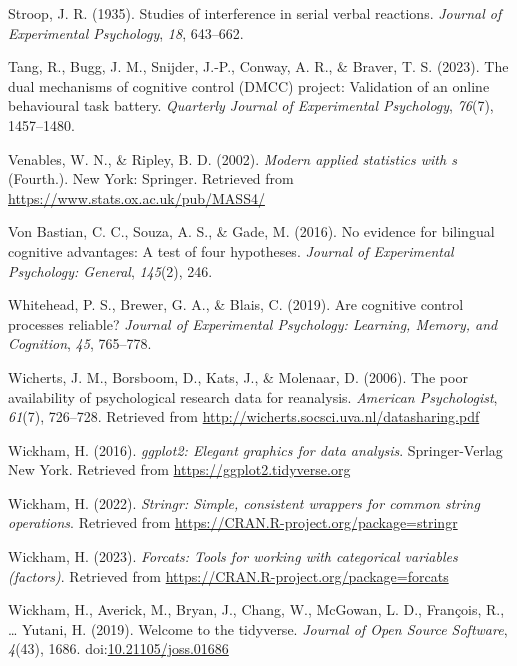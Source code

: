 \documentclass[
  man,floatsintext]{apa6}
\newlength{\cslhangindent}
\newlength{\cslentryspacingunit} %
\newenvironment{CSLReferences}[2] %
 {%
  \setlength{\parindent}{0pt}
  \ifodd #1
  \let\oldpar\par
  \def\par{\hangindent=\cslhangindent\oldpar}
  \fi
  \setlength{\parskip}{#2\cslentryspacingunit}
 }%
 {}
\begin{document}
\begin{CSLReferences}{1}{0}
\leavevmode{}%
Stroop, J. R. (1935). Studies of interference in serial verbal reactions. \emph{Journal of Experimental Psychology}, \emph{18}, 643--662.

\leavevmode{}%
Tang, R., Bugg, J. M., Snijder, J.-P., Conway, A. R., \& Braver, T. S. (2023). The dual mechanisms of cognitive control (DMCC) project: Validation of an online behavioural task battery. \emph{Quarterly Journal of Experimental Psychology}, \emph{76}(7), 1457--1480.

\leavevmode{}%
Venables, W. N., \& Ripley, B. D. (2002). \emph{Modern applied statistics with s} (Fourth.). New York: Springer. Retrieved from \url{https://www.stats.ox.ac.uk/pub/MASS4/}

\leavevmode{}%
Von Bastian, C. C., Souza, A. S., \& Gade, M. (2016). No evidence for bilingual cognitive advantages: A test of four hypotheses. \emph{Journal of Experimental Psychology: General}, \emph{145}(2), 246.

\leavevmode{}%
Whitehead, P. S., Brewer, G. A., \& Blais, C. (2019). Are cognitive control processes reliable? \emph{Journal of Experimental Psychology: Learning, Memory, and Cognition}, \emph{45}, 765--778.

\leavevmode{}%
Wicherts, J. M., Borsboom, D., Kats, J., \& Molenaar, D. (2006). The poor availability of psychological research data for reanalysis. \emph{American Psychologist}, \emph{61}(7), 726--728. Retrieved from \url{http://wicherts.socsci.uva.nl/datasharing.pdf}

\leavevmode{}%
Wickham, H. (2016). \emph{ggplot2: Elegant graphics for data analysis}. Springer-Verlag New York. Retrieved from \url{https://ggplot2.tidyverse.org}

\leavevmode{}%
Wickham, H. (2022). \emph{Stringr: Simple, consistent wrappers for common string operations}. Retrieved from \url{https://CRAN.R-project.org/package=stringr}

\leavevmode{}%
Wickham, H. (2023). \emph{Forcats: Tools for working with categorical variables (factors)}. Retrieved from \url{https://CRAN.R-project.org/package=forcats}

\leavevmode{}%
Wickham, H., Averick, M., Bryan, J., Chang, W., McGowan, L. D., François, R., \ldots{} Yutani, H. (2019). Welcome to the {tidyverse}. \emph{Journal of Open Source Software}, \emph{4}(43), 1686. doi:\href{https://doi.org/10.21105/joss.01686}{10.21105/joss.01686}


\end{CSLReferences}
\end{document}
